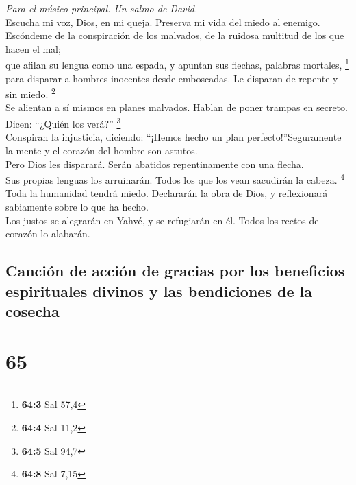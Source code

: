 \emph{Para el músico principal. Un salmo de David.}\\
 Escucha mi voz, Dios, en mi queja. Preserva mi vida del
miedo al enemigo.\\
 Escóndeme de la conspiración de los malvados, de la
ruidosa multitud de los que hacen el mal;\\
 que afilan su lengua como una espada, y apuntan sus
flechas, palabras mortales, \footnote{\textbf{64:3} Sal 57,4}\\
 para disparar a hombres inocentes desde emboscadas. Le
disparan de repente y sin miedo. \footnote{\textbf{64:4} Sal 11,2}\\
 Se alientan a sí mismos en planes malvados. Hablan de
poner trampas en secreto. Dicen: ``¿Quién los verá?'' \footnote{\textbf{64:5}
  Sal 94,7}\\
 Conspiran la injusticia, diciendo: ``¡Hemos hecho un plan
perfecto!''Seguramente la mente y el corazón del hombre son astutos.\\
 Pero Dios les disparará. Serán abatidos repentinamente
con una flecha.\\
 Sus propias lenguas los arruinarán. Todos los que los
vean sacudirán la cabeza. \footnote{\textbf{64:8} Sal 7,15}\\
 Toda la humanidad tendrá miedo. Declararán la obra de
Dios, y reflexionará sabiamente sobre lo que ha hecho.\\
 Los justos se alegrarán en Yahvé, y se refugiarán en él.
Todos los rectos de corazón lo alabarán.

\hypertarget{canciuxf3n-de-acciuxf3n-de-gracias-por-los-beneficios-espirituales-divinos-y-las-bendiciones-de-la-cosecha}{%
\subsection{Canción de acción de gracias por los beneficios espirituales
divinos y las bendiciones de la
cosecha}\label{canciuxf3n-de-acciuxf3n-de-gracias-por-los-beneficios-espirituales-divinos-y-las-bendiciones-de-la-cosecha}}

\hypertarget{section-63}{%
\section{65}\label{section-63}}

